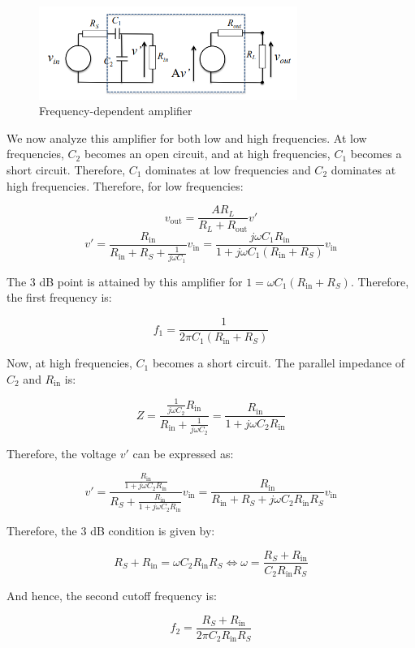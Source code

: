 \documentclass{article}
\begin{document}
\begin{figure}[h]
    \centering
    \includegraphics[width=0.75\textwidth]{images/amplifier2.png}
    \caption{Frequency-dependent amplifier}
    \label{fig:amplifier2}
\end{figure}

We now analyze this amplifier for both low and high frequencies. At low frequencies, $C_2$ becomes an open circuit, and at high frequencies, $C_1$ becomes a short circuit. Therefore, $C_1$ dominates at low frequencies and $C_2$ dominates at high frequencies. Therefore, for low frequencies:

\[ v_{\text{out}} = \frac{AR_L}{R_L + R_{\text{out}}}v' \]
\[ v' = \frac{R_{\text{in}}}{R_{\text{in}} + R_S + \frac{1}{j\omega C_1}}v_{\text{in}} = \frac{j\omega C_1R_{\text{in}}}{1 + j\omega C_1(R_{\text{in}} + R_S)}v_{\text{in}} \]

The $3$ dB point is attained by this amplifier for $1 = \omega C_1(R_{\text{in}} + R_S)$. Therefore, the first frequency is:

\[ f_1 = \frac{1}{2\pi C_1(R_{\text{in}} + R_S)} \]

Now, at high frequencies, $C_1$ becomes a short circuit. The parallel impedance of $C_2$ and $R_{\text{in}}$ is:

\[ Z = \frac{\frac{1}{j\omega C_2} R_{\text{in}}}{R_{\text{in}} + \frac{1}{j\omega C_2}} = \frac{R_{\text{in}}}{1 + j\omega C_2R_{\text{in}}}\]

Therefore, the voltage $v'$ can be expressed as:

\[ v' = \frac{\frac{R_{\text{in}}}{1 + j\omega C_2R_{\text{in}}}}{R_S + \frac{R_{\text{in}}}{1 + j\omega C_2R_{\text{in}}}}v_{\text{in}} = \frac{R_{\text{in}}}{R_{\text{in}} + R_S + j\omega C_2R_{\text{in}}R_S}v_{\text{in}} \]

Therefore, the $3$ dB condition is given by:

\[ R_S + R_{\text{in}} = \omega C_2R_{\text{in}}R_S \iff \omega = \frac{R_S + R_{\text{in}}}{C_2R_{\text{in}}R_S} \]

And hence, the second cutoff frequency is:

\[ f_2 = \frac{R_S + R_{\text{in}}}{2\pi C_2R_{\text{in}}R_S} \]
\end{document}
